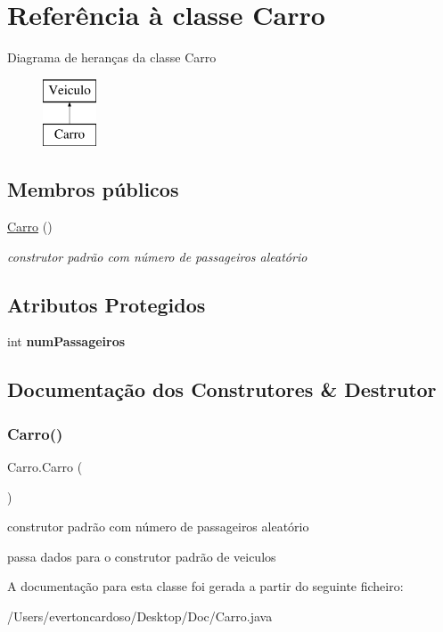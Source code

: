 \hypertarget{class_carro}{}\section{Referência à classe Carro}
\label{class_carro}
Diagrama de heranças da classe Carro\begin{figure}[H]
\begin{center}
\leavevmode
\includegraphics[height=2.000000cm]{class_carro}
\end{center}
\end{figure}
\subsection*{Membros públicos}
\begin{DoxyCompactItemize}
\item 
\mbox{\hyperlink{class_carro_a853f79365b5c36491d34cf8f3815f75e}{Carro}} ()
\begin{DoxyCompactList}\small\item\em construtor padrão com número de passageiros aleatório \end{DoxyCompactList}\end{DoxyCompactItemize}
\subsection*{Atributos Protegidos}
\begin{DoxyCompactItemize}
\item 
\mbox{\label{class_carro_a078d618deb133f1bd65f421c10c77507}} 
int {\bfseries num\+Passageiros}
\end{DoxyCompactItemize}


\subsection{Documentação dos Construtores \& Destrutor}
\mbox{\label{class_carro_a853f79365b5c36491d34cf8f3815f75e}} 
\subsubsection{\texorpdfstring{Carro()}{Carro()}}
{\footnotesize\ttfamily Carro.\+Carro (\begin{DoxyParamCaption}{ }\end{DoxyParamCaption})}



construtor padrão com número de passageiros aleatório 

passa dados para o construtor padrão de veiculos 

A documentação para esta classe foi gerada a partir do seguinte ficheiro\+:\begin{DoxyCompactItemize}
\item 
/\+Users/evertoncardoso/\+Desktop/\+Doc/Carro.\+java\end{DoxyCompactItemize}
